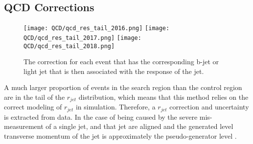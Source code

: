 \subsection{QCD Corrections}


\begin{figure}
	\begin{center}
  \texttt{[image: QCD/qcd\_res\_tail\_2016.png]}
  \texttt{[image: QCD/qcd\_res\_tail\_2017.png]}
  \texttt{[image: QCD/qcd\_res\_tail\_2018.png]}
	\end{center}
	\caption[QCD Jet Response for each b-jet and light jet]{The correction for each event that has the corresponding b-jet or light jet that is then associated with the response of the jet. }
	\label{fig:qcd-cr-response-corr}
\end{figure}

A much larger proportion of events in the search region than the control region are in the tail of the $r_{jet}$ distribution, which means that this method relies on the correct modeling of $r_{jet}$ in simulation. Therefore, a $r_{jet}$ correction and uncertainty is extracted from data. In the case of \met{} being caused by the severe mis-measurement of a single jet, \met{} and that jet are aligned and the generated level transverse momentum of the jet is approximately the pseudo-generator level \pt.

